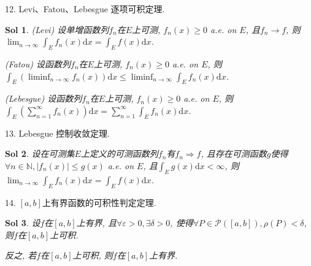 \documentclass[UTF8]{article}
\newtheorem{solution}{Sol}
\begin{document}
    12. Levi、Fatou、Lebesgue 逐项可积定理.\par
    \begin{solution}
        (Levi) 设单增函数列$f_n$在$E$上可测, $f_n(x)\geqslant 0$ a.e. on $E$, 且$f_n\rightarrow f$, 则$\lim_{n \to \infty}\int_E f_n(x) \mathrm{d}x = \int_E f(x) \mathrm{d}x$.\par
        (Fatou) 设函数列$f_n$在$E$上可测, $f_n(x)\geqslant 0$ a.e. on $E$,  则$\int_E \left(\liminf_{n\to \infty}f_n(x)\right) \mathrm{d}x \leqslant \liminf_{n\to \infty}\int_E f_n(x) \mathrm{d}x$.\par
        (Lebesgue) 设函数列$f_n$在$E$上可测, $f_n(x)\geqslant 0$ a.e. on $E$, 则$\int_E \left(\sum_{n=1}^{\infty}f_n(x)\right) \mathrm{d}x = \sum_{n=1}^{\infty}\int_E f_n(x) \mathrm{d}x$.\par
    \end{solution}
    13. Lebesgue 控制收敛定理.\par
    \begin{solution}
        设在可测集$E$上定义的可测函数列$f_n$有$f_n\Rightarrow f$, 且存在可测函数$g$使得$\forall n\in \mathbb{N}, |f_n(x)|\leqslant g(x)$ a.e. on $E$, 且$\int_E g(x) \mathrm{d}x < \infty$, 则$\lim_{n \to \infty}\int_E f_n(x) \mathrm{d}x = \int_E f(x) \mathrm{d}x$.\par
    \end{solution}
    14. $[a,b]$上有界函数的可积性判定定理.\par
    \begin{solution}
        设$f$在$[a,b]$上有界, 且$\forall \varepsilon > 0, \exists \delta > 0$, 使得$\forall P\in \mathcal{P}([a,b]), \rho(P)<\delta$, 则$f$在$[a,b]$上可积.\par
        反之, 若$f$在$[a,b]$上可积, 则$f$在$[a,b]$上有界.\par
    \end{solution}
    
\end{document}
